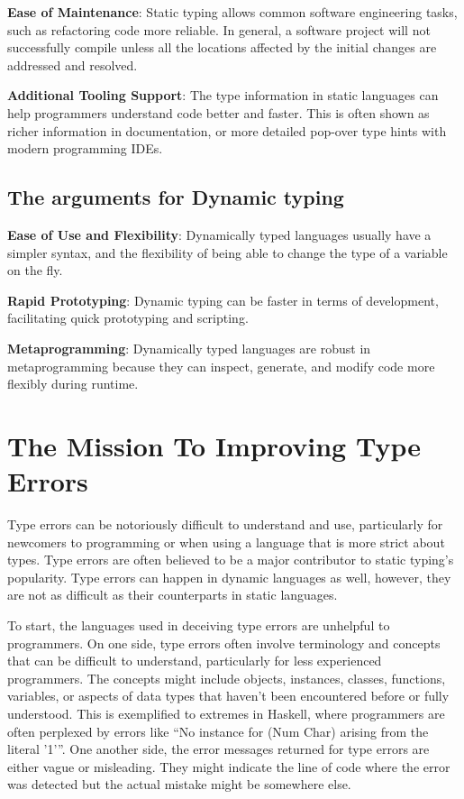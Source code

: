 \textbf{Ease of Maintenance}: Static typing allows common software engineering tasks, such as refactoring code more reliable. In general, a software project will not successfully compile unless all the  locations affected by the initial changes are addressed and resolved.

\textbf{Additional Tooling Support}: The type information in static languages can help programmers understand code better and faster. This is often shown as richer information in documentation, or more detailed pop-over type hints with modern programming IDEs.  

\subsection{The arguments for Dynamic typing}

\textbf{Ease of Use and Flexibility}: Dynamically typed languages usually have a simpler syntax, and the flexibility of being able to change the type of a variable on the fly.

\textbf{Rapid Prototyping}: Dynamic typing can be faster in terms of development, facilitating quick prototyping and scripting.

\textbf{Metaprogramming}: Dynamically typed languages are robust in metaprogramming because they can inspect, generate, and modify code more flexibly during runtime.


\section{The Mission To Improving Type Errors}


Type errors can be notoriously difficult to understand and use, particularly for newcomers to programming or when using a language that is more strict about types. Type errors are often believed to be a major contributor to static typing's popularity. Type errors can happen in dynamic languages as well, however, they are not as difficult as their counterparts in static languages.


To start, the languages used in deceiving type errors are unhelpful to programmers. On one side, type errors often involve terminology and concepts that can be difficult to understand, particularly for less experienced programmers. The concepts might include objects, instances, classes, functions, variables, or aspects of data types that haven't been encountered before or fully understood. This is exemplified to extremes in Haskell, where programmers are often perplexed by errors like “No instance for (Num Char) arising from the literal '1'”. One another side,  the error messages returned for type errors are either vague or misleading. They might indicate the line of code where the error was detected but the actual mistake might be somewhere else.


